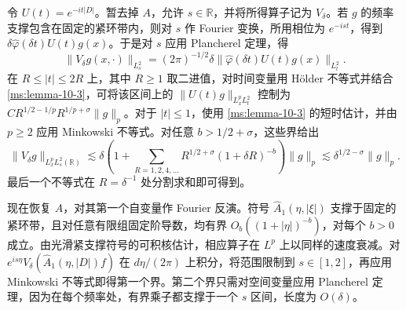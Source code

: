 令 $U(t)=e^{-it|D|}$。暂去掉 $A$，允许 $s\in\mathbb R$，并将所得算子记为 $V_\delta$。若 $g$ 的频率支撑包含在固定的紧环带内，则对 $s$ 作 Fourier 变换，所用相位为 $e^{-ist}$，得到 $\delta\widehat\varphi(\delta t)U(t)g(x)$。于是对 $s$ 应用 Plancherel 定理，得
\[
\|V_\delta g(x,\cdot)\|_{L_s^2}
=(2\pi)^{-1/2}\delta\|\widehat\varphi(\delta t)U(t)g(x)\|_{L_t^2}.
\]
在 $R\le|t|\le2R$ 上，其中 $R\ge1$ 取二进值，对时间变量用 Hölder 不等式并结合 \ref{ms:lemma-10-3}，可将该区间上的 $\|U(t)g\|_{L_x^p L_t^2}$ 控制为 $C R^{1/2-1/p}R^{1/p+\sigma}\|g\|_p$。对于 $|t|\le1$，使用 \ref{ms:lemma-10-3} 的短时估计，并由 $p\ge2$ 应用 Minkowski 不等式。对任意 $b>1/2+\sigma$，这些界给出
\[
 \|V_\delta g\|_{L_x^p L_s^2(\mathbb R)}
 \lesssim \delta\left(1+\sum_{R=1,2,4,\ldots}
 R^{1/2+\sigma}(1+\delta R)^{-b}\right)\|g\|_p
 \lesssim \delta^{1/2-\sigma}\|g\|_p .
\]
最后一个不等式在 $R=\delta^{-1}$ 处分割求和即可得到。

现在恢复 $A$，对其第一个自变量作 Fourier 反演。符号 $\widehat A_1(\eta,|\xi|)$ 支撑于固定的紧环带，且对任意有限组固定阶导数，均有界 $O_b((1+|\eta|)^{-b})$，对每个 $b>0$ 成立。由光滑紧支撑符号的可积核估计，相应算子在 $L^p$ 上以同样的速度衰减。对 $e^{is\eta}V_\delta(\widehat A_1(\eta,|D|)f)$ 在 $d\eta/(2\pi)$ 上积分，将范围限制到 $s\in[1,2]$，再应用 Minkowski 不等式即得第一个界。第二个界只需对空间变量应用 Plancherel 定理，因为在每个频率处，有界乘子都支撑于一个 $s$ 区间，长度为 $O(\delta)$。
